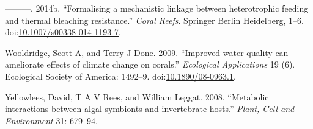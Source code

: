 \documentclass[]{elsarticle} %
\begin{document}
\hypertarget{ref-Wooldridge:2014hc}{}
---------. 2014b. ``Formalising a mechanistic linkage between
heterotrophic feeding and thermal bleaching resistance.'' \emph{Coral
Reefs}. Springer Berlin Heidelberg, 1--6.
doi:\href{https://doi.org/10.1007/s00338-014-1193-7}{10.1007/s00338-014-1193-7}.

\hypertarget{ref-Wooldridge:2009kb}{}
Wooldridge, Scott A, and Terry J Done. 2009. ``Improved water quality
can ameliorate effects of climate change on corals.'' \emph{Ecological
Applications} 19 (6). Ecological Society of America: 1492--9.
doi:\href{https://doi.org/10.1890/08-0963.1}{10.1890/08-0963.1}.

\hypertarget{ref-Yellowlees:2008p331}{}
Yellowlees, David, T A V Rees, and William Leggat. 2008. ``Metabolic
interactions between algal symbionts and invertebrate hosts.''
\emph{Plant, Cell and Environment} 31: 679--94.
\end{document}
